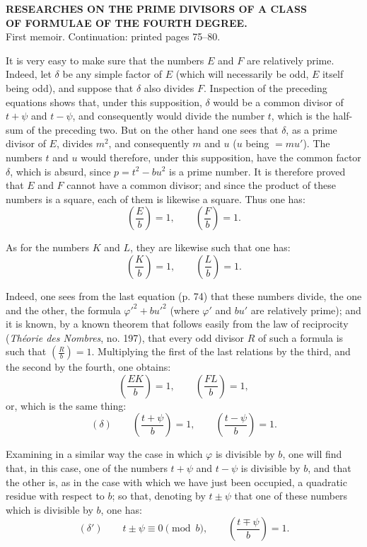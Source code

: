 \documentclass[11pt]{article}
\newcommand{\leg}[2]{\left(\frac{#1}{#2}\right)}
\newcommand{\unitid}[1]{\hypertarget{#1}{}}
\begin{document}
\begin{center}
{\Large\bfseries RESEARCHES ON THE PRIME DIVISORS OF A CLASS\\
OF FORMULAE OF THE FOURTH DEGREE.}\\[1.2em]
{First memoir. Continuation: printed pages 75--80.}
\end{center}

\unitid{dirichlet.v1.p04b.en.par.001}It is very easy to make sure that the numbers $E$ and $F$ are relatively prime. Indeed, let $\delta$ be any simple factor of $E$ (which will necessarily be odd, $E$ itself being odd), and suppose that $\delta$ also divides $F$. Inspection of the preceding equations shows that, under this supposition, $\delta$ would be a common divisor of $t+\psi$ and $t-\psi$, and consequently would divide the number $t$, which is the half-sum of the preceding two. But on the other hand one sees that $\delta$, as a prime divisor of $E$, divides $m^2$, and consequently $m$ and $u$ ($u$ being $=mu'$). The numbers $t$ and $u$ would therefore, under this supposition, have the common factor $\delta$, which is absurd, since $p=t^2-bu^2$ is a prime number. It is therefore proved that $E$ and $F$ cannot have a common divisor; and since the product of these numbers is a square, each of them is likewise a square. Thus one has:
\unitid{dirichlet.v1.p04b.en.eq.001}
\[
\leg{E}{b}=1,\qquad \leg{F}{b}=1.
\]

\unitid{dirichlet.v1.p04b.en.par.002}As for the numbers $K$ and $L$, they are likewise such that one has:
\unitid{dirichlet.v1.p04b.en.eq.002}
\[
\leg{K}{b}=1,\qquad \leg{L}{b}=1.
\]

\unitid{dirichlet.v1.p04b.en.par.003}Indeed, one sees from the last equation (p. 74) that these numbers divide, the one and the other, the formula $\varphi'^2+bu'^2$ (where $\varphi'$ and $bu'$ are relatively prime); and it is known, by a known theorem that follows easily from the law of reciprocity (\emph{Théorie des Nombres}, no. 197), that every odd divisor $R$ of such a formula is such that $\leg{R}{b}=1$. Multiplying the first of the last relations by the third, and the second by the fourth, one obtains:
\unitid{dirichlet.v1.p04b.en.eq.003}
\[
\leg{EK}{b}=1,\qquad \leg{FL}{b}=1,
\]
or, which is the same thing:
\unitid{dirichlet.v1.p04b.en.eq.004}
\[
(\delta)\qquad \leg{t+\psi}{b}=1,\qquad \leg{t-\psi}{b}=1.
\]

\unitid{dirichlet.v1.p04b.en.par.004}Examining in a similar way the case in which $\varphi$ is divisible by $b$, one will find that, in this case, one of the numbers $t+\psi$ and $t-\psi$ is divisible by $b$, and that the other is, as in the case with which we have just been occupied, a quadratic residue with respect to $b$; so that, denoting by $t\pm\psi$ that one of these numbers which is divisible by $b$, one has:
\unitid{dirichlet.v1.p04b.en.eq.005}
\[
(\delta')\qquad t\pm\psi\equiv0\pmod b,\qquad
\leg{t\mp\psi}{b}=1.
\]
\end{document}
